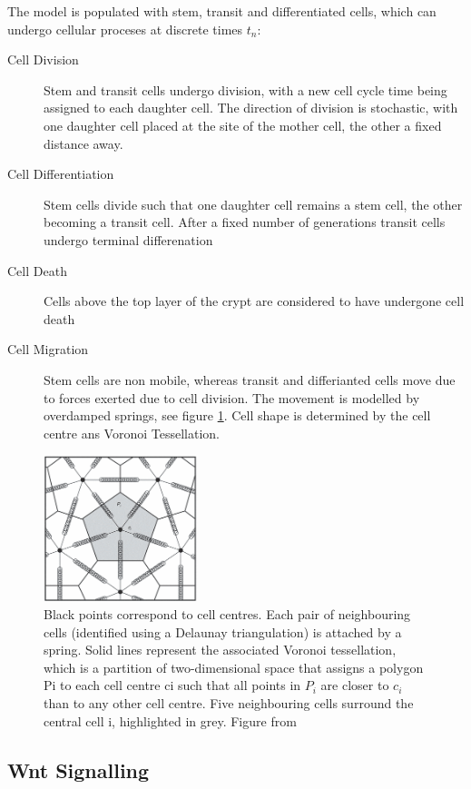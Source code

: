 \documentclass[11pt]{article} %
\begin{document}
The model is populated with stem, transit and differentiated cells, which can undergo cellular proceses at discrete times $t_n$:
\begin{description}
\item[Cell Division]{Stem and transit cells undergo division, with a new cell cycle time being assigned to each daughter cell. The direction of division is stochastic, with one daughter cell placed at the site of the mother cell, the other a fixed distance away.}
\item[Cell Differentiation]{Stem cells divide such that one daughter cell remains a stem cell, the other becoming a transit cell. After a fixed number of generations transit cells undergo terminal differenation}
\item[Cell Death]{Cells above the top layer of the crypt are considered to have undergone cell death}
\item[Cell Migration]{Stem cells are non mobile, whereas transit and differianted cells move due to forces exerted due to cell division. The movement is modelled by overdamped springs, see figure \ref{fig:Mechanical_model}. Cell shape is determined by the cell centre ans Voronoi Tessellation.}
\end{description}

\begin{figure}
\centering
\includegraphics[width=0.4\textwidth]{Mechanical_Model}
\caption{Black points
correspond to cell centres. Each pair of neighbouring cells (identified
using a Delaunay triangulation) is attached by a spring. Solid lines
represent the associated Voronoi tessellation, which is a partition of
two-dimensional space that assigns a polygon Pi to each cell centre ci
such that all points in $P_i$ are closer to $c_i$ than to any other cell centre. Five
neighbouring cells surround the central cell i, highlighted in grey. Figure from \cite{VanLeeuwen2009} }
\label{fig:Mechanical_model}
\end{figure}

\subsection{Wnt Signalling}
\end{document}
